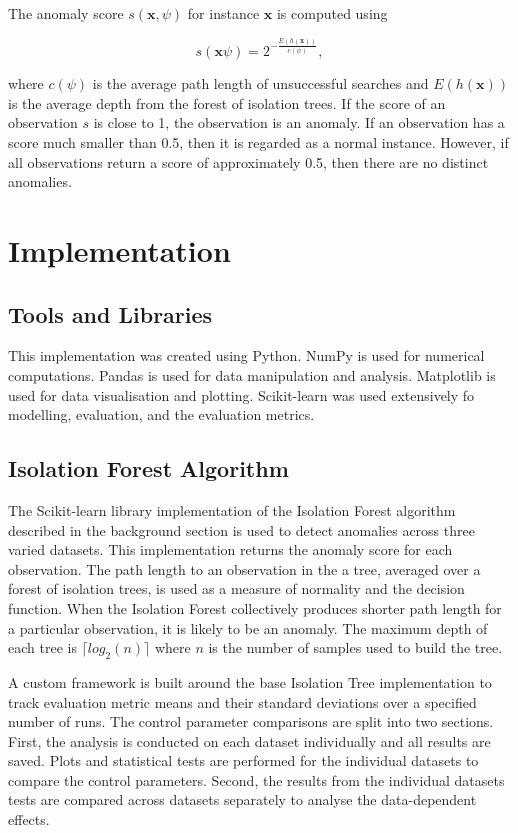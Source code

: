 \documentclass[10pt, conference]{IEEEtran}
\begin{document}
The anomaly score $s(\boldsymbol{x}, \psi)$ for instance $\boldsymbol{x}$ is computed using

\begin{equation}
	s(\boldsymbol{x} \psi) = 2^{- \frac{E(h(\boldsymbol{x}))}{c(\psi)}},
\end{equation}

where $c(\psi)$ is the average path length of unsuccessful searches and $E(h(\boldsymbol{x}))$ is the average depth from the forest of isolation trees. If the score of an observation $s$ is close to 1, the observation is an anomaly. If an observation has a score much smaller than 0.5, then it is regarded as a normal instance. However, if all observations return a score of approximately 0.5, then there are no distinct anomalies.


\section{Implementation}
\subsection{Tools and Libraries}
This implementation was created using Python. NumPy\cite{harris2020array} is used for numerical computations. Pandas\cite{reback2020pandas} is used for data manipulation and analysis. Matplotlib\cite{Hunter:2007} is used for data visualisation and plotting. Scikit-learn\cite{scikit-learn} was used extensively fo modelling, evaluation, and the evaluation metrics.
\subsection{Isolation Forest Algorithm}
The Scikit-learn library \cite{scikit-learn} implementation of the Isolation Forest algorithm described in the background section is used to detect anomalies across three varied datasets. This implementation returns the anomaly score for each observation. The path length to an observation in the a tree, averaged over a forest of isolation trees, is used as a measure of normality and the decision function. When the Isolation Forest collectively produces shorter path length for a particular observation, it is likely to be an anomaly. The maximum depth of each tree is $\lceil log_2(n) \rceil$ where $n$ is the number of samples used to build the tree.

A custom framework is built around the base Isolation Tree implementation to track evaluation metric means and their standard deviations over a specified number of runs. The control parameter comparisons are split into two sections. First, the analysis is conducted on each dataset individually and all results are saved. Plots and statistical tests are performed for the individual datasets to compare the control parameters. Second, the results from the individual datasets tests are compared across datasets separately to analyse the data-dependent effects.
\end{document}
